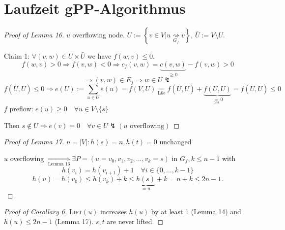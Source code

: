 \documentclass[12pt,oneside,a4paper,parskip=on,fleqn]{scrartcl}
\begin{document}
\section*{Laufzeit gPP-Algorithmus}
	\begin{proof}[Proof of Lemma 16]
		$u$ overflowing node. $U := \left\{ v\in V | u\underset{G_f}{\rightsquigarrow} v \right\}$, $\bar{U} := V\setminus U$.

		Claim 1: $\forall (v,w) \in U\times \bar{U}$ we have $f(w,v) \leq 0$.\\
		\[f(w,v) > 0 \Rightarrow f(v,w) < 0 \Rightarrow c_f(v,w) = \underbrace{c(v,w)}_{\geq 0} - f(v,w) > 0\]
		\[
			\Rightarrow (v,w)\in E_f \Rightarrow w\in U \lightning
		\]\[
			f(\bar{U},U) \leq 0 \Rightarrow e(U) := \sum_{u\in U} e(u) = f(V,U) \underset{\text{L6e}}{=} f(\bar{U},U) + \underbrace{f(U,U)}_{\underset{\text{L6a}}{=}0}
			= f(\bar{U},U) \leq 0
		\]
		$f$ preflow: $e(u) \geq 0 \quad \forall u\in V\setminus \{s\}$

		Then $s\not\in U \Rightarrow e(v) = 0 \quad \forall v\in U \lightning (u \text{ overflowing})$
	\end{proof}

	\begin{proof}[Proof of Lemma 17]
		$n = |V|: h(s) = n, h(t) = 0$ unchanged \checkmark

		$u$ overflowing $\underset{\text{Lemma 16}}{\Rightarrow} \exists P = (u=v_0,v_1,v_2,\ldots,v_k=s) \text{ in } G_f, k\leq n-1$ with
		\[
			h(v_i) = h(v_{i+1}) + 1\quad \forall i\in \{0,\ldots,k-1\}
		\]
		\[
			h(u) = h(v_0) \leq h(v_k) + k \leq \underbrace{h(s)}_{=n} + k = n+k \leq 2n-1.
		\]
	\end{proof}

	\begin{proof}[Proof of Corollary 6]
		\textsc{Lift}$(u)$ increases $h(u)$ by at least 1 (Lemma 14) and $h(u) \leq 2n-1$ (Lemma 17). $s, t$ are never lifted.
	\end{proof}
\end{document}
